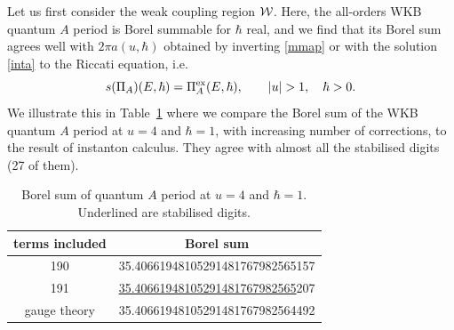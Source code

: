 \documentclass[a4paper,11pt]{article}
\theoremstyle{definition}
\newcommand{\CW}{{\cal W}}
\newcommand{\be}{\begin{equation}}
\newcommand{\ee}{\end{equation}}
\begin{document}
Let us first consider the weak coupling region $\CW$. Here, the
all-orders WKB quantum $A$ period is Borel summable for $\hbar$ real,
and we find that its Borel sum agrees well with $2 \pi a(u, \hbar)$
obtained by inverting \eqref{mmap} or with the solution \eqref{inta}
to the Riccati equation, i.e.
%
\be
s(\Pi_A)(E,\hbar)= \Pi_A^{\rm ex}( E,\hbar), \qquad |u|>1, \quad \hbar>0. 
\ee
%
We illustrate this in Table~\ref{tb:BorelSum-A} where we compare the
Borel sum of the WKB quantum $A$ period at $u=4$ and $\hbar=1$, with
increasing number of corrections, to the result of instanton
calculus. They agree with almost all the stabilised digits (27 of
them).

\begin{table}
  \centering
  \begin{tabular}{cc}\toprule
    terms included & Borel sum \\\midrule
    190 & 35.40661948105291481767982565157 \\
    191 & \underline{35.40661948105291481767982565}207\\\midrule
    gauge theory & 35.40661948105291481767982564492 \\\bottomrule
  \end{tabular}
  \caption{Borel sum of quantum $A$ period at $u=4$ and
    $\hbar=1$. Underlined are stabilised digits.}
  \label{tb:BorelSum-A}
\end{table}
\end{document}
